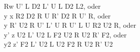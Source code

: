 Rw U' L D2 L' U L D2 L2, oder\\
y x R2 D2 R U R' D2 R U' R, oder\\
y R' U2 R U' L' U R U' L U R2 U2 R, oder\\
y' z U2 L' U2 L F2 U2 R U2 R' F2, oder\\
y2 z' F2 L' U2 L U2 F2 R U2 R' U2\\
